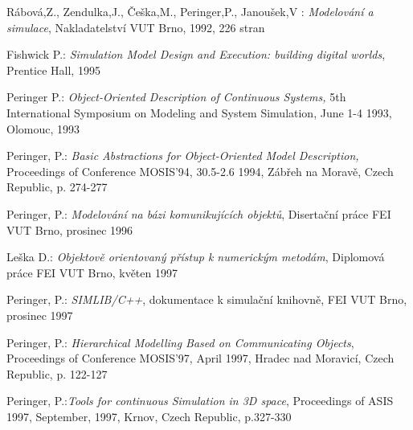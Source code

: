\documentclass[a4paper]{article}
\begin{document}
\begin{thebibliography}{1}

Rábová,Z., Zendulka,J., Češka,M., Peringer,P., Janoušek,V :
{\it Modelování a simulace}, Nakladatelství VUT Brno, 1992, 226 stran

Fishwick P.: {\it Simulation Model Design and Execution: building digital
  worlds}, Prentice Hall, 1995

Peringer P.: {\it Object-Oriented Description of Continuous Systems,} 5th
  International Symposium on Modeling and System Simulation, June 1-4 1993,
  Olomouc, 1993

Peringer, P.: {\it Basic Abstractions for Object-Oriented Model
  Description,} Proceedings of Conference MOSIS'94, 30.5-2.6 1994,
  Zábřeh na  Moravě, Czech Republic, p. 274-277

Peringer, P.: {\it Modelování na bázi komunikujících objektů},
 Disertační práce FEI VUT Brno, prosinec 1996

Leška D.: {\it Objektově orientovaný přístup k numerickým metodám},
Diplomová práce FEI VUT Brno, květen 1997

Peringer, P.: {\it SIMLIB/C++},
dokumentace k simulační knihovně, FEI VUT Brno, prosinec 1997

Peringer, P.:{\it
  Hierarchical Modelling Based on Communicating Objects},
  Proceedings of Conference MOSIS'97, April 1997,
  Hradec nad Moravicí, Czech Republic, p. 122-127

Peringer, P.:{\it Tools for continuous Simulation in 3D space},
  Proceedings of ASIS 1997, September, 1997,
  Krnov, Czech Republic, p.327-330
 
\end{thebibliography}
\end{document}

